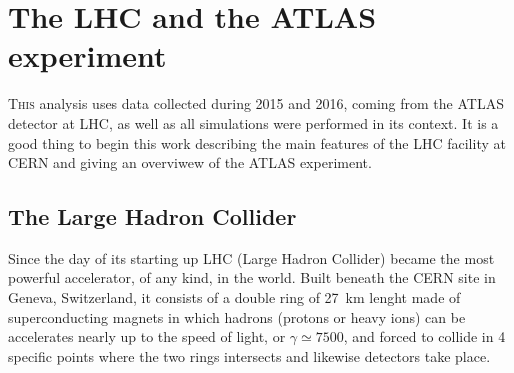 
\chapter{The LHC and the ATLAS experiment}
\lettrine{T}{his} analysis uses data collected during 2015 and 2016, coming from the ATLAS detector at LHC, as well as all simulations were performed in its context. It is a good thing to begin this work describing the main features of the LHC facility at CERN and giving an overviwew of the ATLAS experiment.

\section{The Large Hadron Collider}
Since the day of its starting up LHC (Large Hadron Collider) became the most powerful accelerator, of any kind, in the world. Built beneath the CERN site in Geneva, Switzerland, it consists of a double ring of \SI{27}{km} lenght made of superconducting magnets in which hadrons (protons or heavy ions) can be accelerates nearly up to the speed of light, or $\gamma\simeq7500$, and forced to collide in 4 specific points where the two rings intersects and likewise detectors take place.

